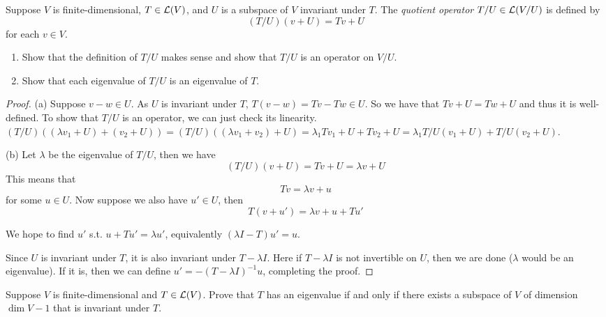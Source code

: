 \documentclass{extarticle}
\begin{document}
\begin{problem}{38}
    Suppose \(V\) is finite-dimensional, \(T \in \mathcal{L}(V)\), and \(U\) is a subspace 
    of \(V\) invariant under \(T\). The \emph{quotient operator} \(T/U \in \mathcal{L}(V/U)\) 
    is defined by 
    \[(T/U)(v + U) = Tv + U\]
    for each \(v \in V\). 
    \begin{enumerate}[label=(\alph*)]
        \item Show that the definition of \(T/U\) makes sense and show that \(T/U\) is an operator 
        on \(V/U\).
        \item Show that each eigenvalue of \(T/U\) is an eigenvalue of \(T\). 
    \end{enumerate}
\end{problem}

\begin{proof}
(a) Suppose \(v - w \in U\). As \(U\) is invariant under \(T\), \(T(v - w) = Tv - Tw \in U\). 
So we have that \(Tv + U = Tw + U\) and thus it is well-defined. To show that \(T/U\) is an operator, 
we can just check its linearity. \((T/U)( (\lambda v_1 + U) + (v_2 + U)  ) 
= (T/U)((\lambda v_1 + v_2) + U) = \lambda_1 Tv_1 + U + T v_2 + U = \lambda_1 T/U(v_1 + U) 
+ T/U (v_2 + U)\). 

(b) Let \(\lambda\) be the eigenvalue of \(T/U\), then we have 
\[(T/U)(v+U) = Tv + U = \lambda v + U\]
This means that 
\[Tv = \lambda v + u\]
for some \(u \in U\). Now suppose we also have \(u' \in U\), then 
\[T(v + u') = \lambda v + u + Tu'\]

We hope to find \(u'\) s.t. \(u + Tu' = \lambda u'\), equivalently \((\lambda I - T)u' = u\).

Since \(U\) is invariant under \(T\), it is also invariant under \(T - \lambda I\). Here 
if \(T - \lambda I\) is not invertible on \(U\), then we are done (\(\lambda\) would be 
an eigenvalue). If it is, then we can define \(u' = -(T - \lambda I)^{-1}u\), completing the proof.
\end{proof}

\begin{problem}{39}
    Suppose \(V\) is finite-dimensional and \(T \in \mathcal{L}(V)\). Prove that \(T\) has an eigenvalue 
    if and only if there exists a subspace of \(V\) of dimension \(\dim V -1\) that is invariant 
    under \(T\).
\end{problem}
\end{document}
